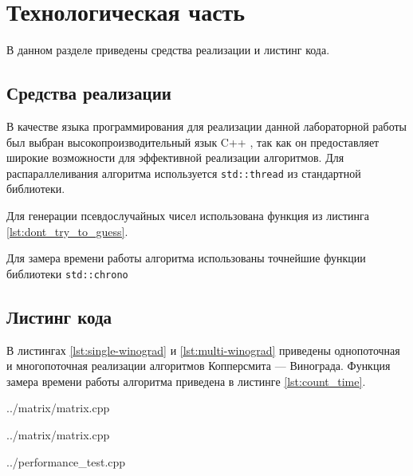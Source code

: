 \documentclass[a4paper,14pt]{extreport}
\newcommand{\code}[1]{\texttt{#1}}
\begin{document}
\chapter{Технологическая часть}

В данном разделе приведены средства реализации и листинг кода.

\section{Средства реализации}

В качестве языка программирования для реализации данной лабораторной работы был выбран высокопроизводительный язык C++ \cite{cpp17}, так как он предоставляет широкие возможности для эффективной реализации алгоритмов.
Для распараллеливания алгоритма используется \code{std::thread} из стандартной библиотеки.

Для генерации псевдослучайных чисел использована функция из листинга \ref{lst:dont_try_to_guess}.

Для замера времени работы алгоритма использованы точнейшие функции библиотеки \code{std::chrono}

\section{Листинг кода}

В листингах \ref{lst:single-winograd} и \ref{lst:multi-winograd} приведены однопоточная и многопоточная реализации алгоритмов Копперсмита — Винограда.
Функция замера времени работы алгоритма приведена в листинге \ref{lst:count_time}.

\begin{lstinputlisting}[
	caption={Последовательный алгоритм Копперсмита — Винограда},
	label={lst:single-winograd},
	style={cpp},
	linerange={5-67}
	]{../matrix/matrix.cpp}
\end{lstinputlisting}

\begin{lstinputlisting}[
	caption={Параллельный алгоритм Копперсмита — Винограда},
	label={lst:multi-winograd},
	style={cpp},
	linerange={69-167}
	]{../matrix/matrix.cpp}
\end{lstinputlisting}

\begin{lstinputlisting}[
	caption={Продвинутый генератор псевдослучайных чисел},
	label={lst:dont_try_to_guess},
	style={cpp},
	linerange={8-12}
	]{../performance_test.cpp}
\end{lstinputlisting}
\end{document}
